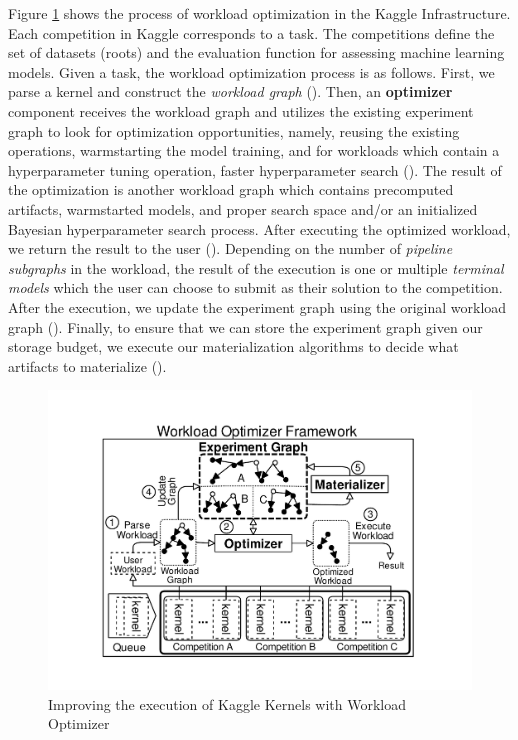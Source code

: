 Figure \ref{improved-use-case} shows the process of workload optimization in the Kaggle Infrastructure.
Each competition in Kaggle corresponds to a task.
The competitions define the set of datasets (roots) and the evaluation function for assessing machine learning models. 
Given a task, the workload optimization process is as follows.
First, we parse a kernel and construct the \textit{workload graph} ().
Then, an \textbf{optimizer} component receives the workload graph and utilizes the existing experiment graph to look for optimization opportunities, namely, reusing the existing operations, warmstarting the model training, and for workloads which contain a hyperparameter tuning operation, faster hyperparameter search ().
The result of the optimization is another workload graph which contains precomputed artifacts, warmstarted models, and proper search space and/or an initialized Bayesian hyperparameter search process.
After executing the optimized workload, we return the result to the user ().
Depending on the number of \textit{pipeline subgraphs} in the workload, the result of the execution is one or multiple \textit{terminal models} which the user can choose to submit as their solution to the competition.
After the execution, we update the experiment graph using the original workload graph ().
Finally, to ensure that we can store the experiment graph given our storage budget, we execute our materialization algorithms to decide what artifacts to materialize ().

\begin{figure}
\centering
\includegraphics[width=\columnwidth]{../images/kaggle-workload-optimizer}
\caption{Improving the execution of Kaggle Kernels with Workload Optimizer}
\label{improved-use-case}
\end{figure}

